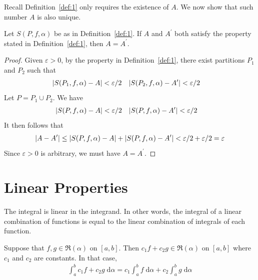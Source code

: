 \documentclass[thmcnt=section, 12pt]{my-elegantbook}
\begin{document}
\par Recall Definition~\ref{def:1} only requires the existence of $A$. We now show that such number $A$ is also unique.

\begin{proposition} \label{pro:3}
    Let $S(P,f,\alpha)$ be as in Definition~\ref{def:1}. If $A$ and $A^\prime$ both satisfy the property stated in Definition~\ref{def:1}, then $A = A^\prime$.
\end{proposition}

\begin{proof}
    Given $\varepsilon > 0$, by the property in Definition~\ref{def:1}, there exist partitions $P_1$ and $P_2$ such that  
    \begin{align*}
        \left\lvert S(P_1,f,\alpha) - A \right\rvert &< \varepsilon / 2 &
        \left\lvert S(P_2,f,\alpha) - A^\prime \right\rvert &< \varepsilon / 2
    \end{align*}
    Let $P = P_1 \cup P_2$. We have
    \begin{align*}
        \left\lvert S(P,f,\alpha) - A \right\rvert &< \varepsilon / 2 &
        \left\lvert S(P,f,\alpha) - A^\prime \right\rvert &< \varepsilon / 2
    \end{align*}
    It then follows that
    \begin{align*}
        \left\lvert A - A^\prime \right\rvert
        \leq \left\lvert S(P,f,\alpha) - A \right\rvert +
        \left\lvert S(P,f,\alpha) - A^\prime \right\rvert 
        < \varepsilon / 2 + \varepsilon / 2
        = \varepsilon
    \end{align*}
    Since $\varepsilon > 0$ is arbitrary, we must have $A = A^\prime$.
\end{proof}


\section{Linear Properties}


\par The integral is linear in the integrand. In other words, the integral of a linear combination of functions is equal to the linear combination of integrals of each function.

\begin{theorem} \label{thm:18}
    Suppose that $f, g \in \mathfrak{R}(\alpha)$ on $[a,b]$. Then $c_1 f + c_2 g \in \mathfrak{R}(\alpha)$ on $[a,b]$ where $c_1$ and $c_2$ are constants. In that case, 
    \begin{align*}
        \int_a^b c_1 f + c_2 g \; \mathrm{d}\alpha
        = c_1 \int_a^b f \; \mathrm{d}\alpha
        + c_2 \int_a^b g \; \mathrm{d}\alpha
    \end{align*}
\end{theorem}
\end{document}
